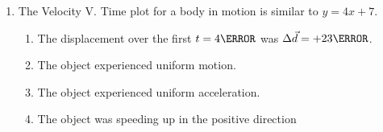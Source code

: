 \documentclass[12pt]{article} %
\begin{document}
\begin{qstn}[2]
\begin{enumerate}
        \item The Velocity V. Time plot for a body in motion is similar to $y = 4x + 7$.
            \begin{enumerate}[label = (\alph*)]
                \item The displacement over the first $t = 4\s$ was $\Delta \vec d = +23\m$.
                \item The object experienced uniform motion.
                \item The object experienced uniform acceleration.
                \item The object was speeding up in the positive direction
            \end{enumerate}
        
        \end{enumerate}

    \end{qstn}
\end{document}
